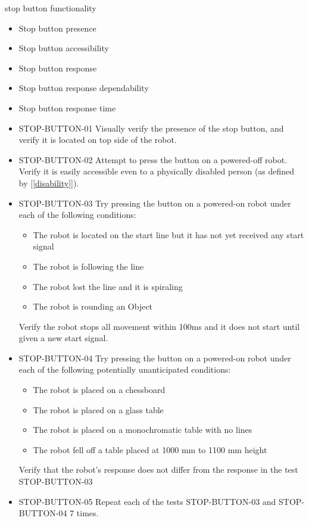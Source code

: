 \begin{itemize}
        {stop button functionality}
        {
            \begin{itemize}
                \item Stop button presence
                \item Stop button accessibility
                \item Stop button response
                \item Stop button response dependability
                \item Stop button response time
            \end{itemize}
        }
        {
            \begin{itemize}
                \item STOP-BUTTON-01 \quad Visually verify the presence of the stop button, and verify it is located on top side of the robot.
                \item STOP-BUTTON-02 \quad Attempt to press the button on a powered-off robot. Verify it is easily accessible even to a physically disabled person (as defined by [\ref{disability}]).
                \item STOP-BUTTON-03 \quad Try pressing the button on a powered-on robot under each of the following conditions:
                    \begin{itemize}
                        \item The robot is located on the start line but it has not yet received any start signal
                        \item The robot is following the line
                        \item The robot lost the line and it is spiraling
                        \item The robot is rounding an Object
                    \end{itemize}
                    Verify the robot stops all movement within 100ms and it does not start until given a new start signal.
                \item STOP-BUTTON-04 \quad Try pressing the button on a powered-on robot under each of the following potentially unanticipated conditions:
                \begin{itemize}
                    \item The robot is placed on a chessboard
                    \item The robot is placed on a glass table
                    \item The robot is placed on a monochromatic table with no lines
                    \item The robot fell off a table placed at 1000 mm to 1100 mm height
                \end{itemize}
                Verify that the robot's response does not differ from the response in the test STOP-BUTTON-03
                \item STOP-BUTTON-05 \quad Repeat each of the tests STOP-BUTTON-03 and STOP-BUTTON-04 7 times.
            \end{itemize}
        }


\end{itemize}
